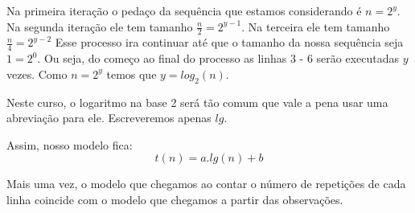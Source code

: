 Na primeira iteração o pedaço da sequência que estamos considerando é $n = 2^y$.
Na segunda iteração ele tem tamanho $\frac{n}{2} = 2^{y-1}$.
Na terceira ele tem tamanho $\frac{n}{4} = 2^{y-2}$
Esse processo ira continuar até que o tamanho da nossa sequência seja $1 = 2^0$.
Ou seja, do começo ao final do processo as linhas 3 - 6 serão executadas $y$ vezes.
Como $n = 2^y$ temos que $y = log_2(n)$.

Neste curso, o logaritmo na base 2 será tão comum que vale a pena usar uma abreviação para ele.
Escreveremos apenas $lg$.

Assim, nosso modelo fica:
\begin{displaymath}
  t(n) = a.lg(n) + b 
\end{displaymath}

Mais uma vez, o modelo que chegamos ao contar o número de repetições de cada linha coincide com o modelo que chegamos a partir das observações.



